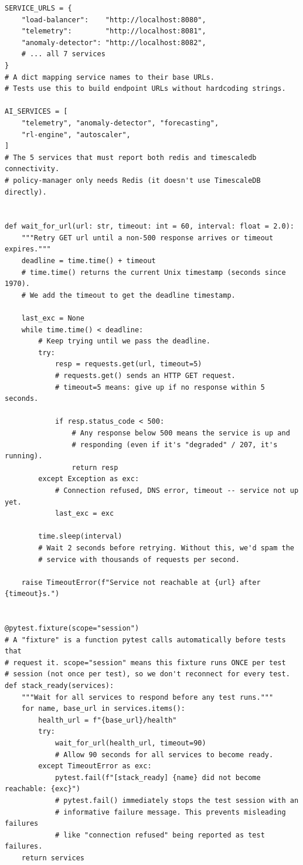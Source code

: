 \documentclass[12pt, a4paper]{article}
\begin{document}
\begin{lstlisting}[style=python, caption={tests/integration/conftest.py --- constants and wait helper}]
SERVICE_URLS = {
    "load-balancer":    "http://localhost:8080",
    "telemetry":        "http://localhost:8081",
    "anomaly-detector": "http://localhost:8082",
    # ... all 7 services
}
# A dict mapping service names to their base URLs.
# Tests use this to build endpoint URLs without hardcoding strings.

AI_SERVICES = [
    "telemetry", "anomaly-detector", "forecasting",
    "rl-engine", "autoscaler",
]
# The 5 services that must report both redis and timescaledb connectivity.
# policy-manager only needs Redis (it doesn't use TimescaleDB directly).


def wait_for_url(url: str, timeout: int = 60, interval: float = 2.0):
    """Retry GET url until a non-500 response arrives or timeout expires."""
    deadline = time.time() + timeout
    # time.time() returns the current Unix timestamp (seconds since 1970).
    # We add the timeout to get the deadline timestamp.

    last_exc = None
    while time.time() < deadline:
        # Keep trying until we pass the deadline.
        try:
            resp = requests.get(url, timeout=5)
            # requests.get() sends an HTTP GET request.
            # timeout=5 means: give up if no response within 5 seconds.

            if resp.status_code < 500:
                # Any response below 500 means the service is up and
                # responding (even if it's "degraded" / 207, it's running).
                return resp
        except Exception as exc:
            # Connection refused, DNS error, timeout -- service not up yet.
            last_exc = exc

        time.sleep(interval)
        # Wait 2 seconds before retrying. Without this, we'd spam the
        # service with thousands of requests per second.

    raise TimeoutError(f"Service not reachable at {url} after {timeout}s.")


@pytest.fixture(scope="session")
# A "fixture" is a function pytest calls automatically before tests that
# request it. scope="session" means this fixture runs ONCE per test
# session (not once per test), so we don't reconnect for every test.
def stack_ready(services):
    """Wait for all services to respond before any test runs."""
    for name, base_url in services.items():
        health_url = f"{base_url}/health"
        try:
            wait_for_url(health_url, timeout=90)
            # Allow 90 seconds for all services to become ready.
        except TimeoutError as exc:
            pytest.fail(f"[stack_ready] {name} did not become reachable: {exc}")
            # pytest.fail() immediately stops the test session with an
            # informative failure message. This prevents misleading failures
            # like "connection refused" being reported as test failures.
    return services
\end{lstlisting}
\end{document}
